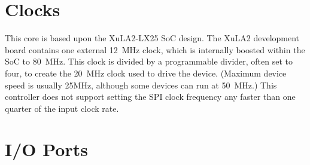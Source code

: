 \documentclass{gqtekspec}
\begin{document}
\chapter{Clocks}\label{ch:clk}

This core is based upon the XuLA2-LX25 SoC design.  The XuLA2 development board
contains one external 12~MHz clock, which is internally boosted within the SoC
to 80~MHz.  This clock is divided by a programmable divider, often set to 
four, to create the 20~MHz clock used to drive the device.  (Maximum device
speed is usually 25MHz, although some devices can run at 50~MHz.)   This
controller does not support setting the SPI clock frequency any faster than
one quarter of the input clock rate.

\chapter{I/O Ports}\label{ch:io}
\end{document}
